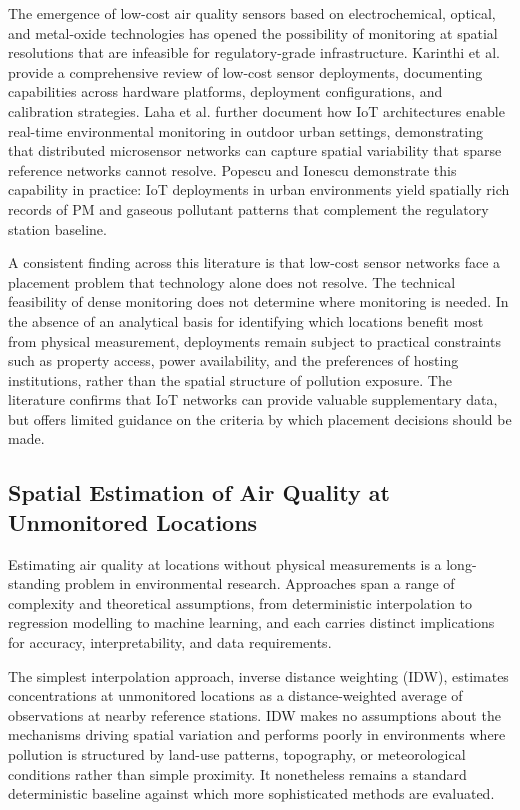 \documentclass[11pt,a4paper]{article}
\let\oldsubsection\subsection
\renewcommand{\subsection}{\FloatBarrier\oldsubsection}
\begin{document}
The emergence of low-cost air quality sensors based on electrochemical, optical, and metal-oxide technologies has opened the possibility of monitoring at spatial resolutions that are infeasible for regulatory-grade infrastructure. Karinthi et al. \cite{karinthi_sustainable_aqm_2022} provide a comprehensive review of low-cost sensor deployments, documenting capabilities across hardware platforms, deployment configurations, and calibration strategies. Laha et al. \cite{laha_iot_env_monitoring_2022} further document how IoT architectures enable real-time environmental monitoring in outdoor urban settings, demonstrating that distributed microsensor networks can capture spatial variability that sparse reference networks cannot resolve. Popescu and Ionescu \cite{popescu_iot_aq_2024} demonstrate this capability in practice: IoT deployments in urban environments yield spatially rich records of PM and gaseous pollutant patterns that complement the regulatory station baseline.

A consistent finding across this literature is that low-cost sensor networks face a placement problem that technology alone does not resolve. The technical feasibility of dense monitoring does not determine where monitoring is needed. In the absence of an analytical basis for identifying which locations benefit most from physical measurement, deployments remain subject to practical constraints such as property access, power availability, and the preferences of hosting institutions, rather than the spatial structure of pollution exposure. The literature confirms that IoT networks can provide valuable supplementary data, but offers limited guidance on the criteria by which placement decisions should be made.

\subsection{Spatial Estimation of Air Quality at Unmonitored Locations}
\label{sec:spatial-estimation}

Estimating air quality at locations without physical measurements is a long-standing problem in environmental research. Approaches span a range of complexity and theoretical assumptions, from deterministic interpolation to regression modelling to machine learning, and each carries distinct implications for accuracy, interpretability, and data requirements.

The simplest interpolation approach, inverse distance weighting (IDW), estimates concentrations at unmonitored locations as a distance-weighted average of observations at nearby reference stations. IDW makes no assumptions about the mechanisms driving spatial variation and performs poorly in environments where pollution is structured by land-use patterns, topography, or meteorological conditions rather than simple proximity. It nonetheless remains a standard deterministic baseline against which more sophisticated methods are evaluated.
\end{document}
